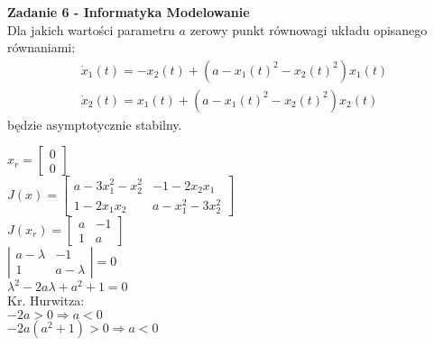 \documentclass[a4paper,11pt]{article}
\begin{document}
\newpage
\begin{framed}
\textbf{Zadanie 6 - Informatyka Modelowanie } \\ 
Dla jakich wartości parametru \( a \) zerowy punkt równowagi układu opisanego równaniami:
\begin{align*}
\dot{x}_{1}(t)=-x_{2}(t)+(a-x_{1}(t)^{2}-x_{2}(t)^{2})x_{1}(t) \\
\dot{x}_{2}(t)=x_{1}(t)+(a-x_{1}(t)^{2}-x_{2}(t)^{2})x_{2}(t)
\end{align*}
będzie asymptotycznie stabilny.
\end{framed}
$x_r=\left[ \begin{array}{c}     0\\0   \end{array}\right]$\\
$J(x)=\left[ \begin{array}{cc}   a-3x_1^2-x_2^2 & -1-2x_2x_1 \\ 1-2x_1x_2 & a-x_1^2-3x_2^2    \end{array}\right]$\\
$J(x_r)=\left[ \begin{array}{cc}    a & -1 \\ 1 & a    \end{array}\right]$\\
$\left| \begin{array}{cc}     a-\lambda & -1 \\ 1 & a-\lambda   \end{array}\right|=0$\\
$\lambda^2-2a\lambda+a^2+1=0$\\
Kr. Hurwitza:\\
$-2a>0 \Rightarrow a<0$\\
$-2a(a^2+1)>0 \Rightarrow a<0$\\
\end{document}
